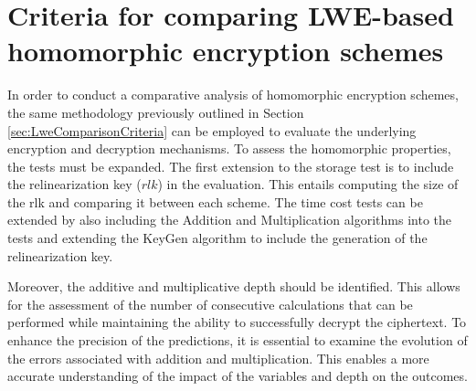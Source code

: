 \section{Criteria for comparing LWE-based homomorphic encryption schemes}

In order to conduct a comparative analysis of homomorphic encryption schemes, the same methodology previously outlined in Section \ref{sec:LweComparisonCriteria} can be employed to evaluate the underlying encryption and decryption mechanisms. To assess the homomorphic properties, the tests must be expanded. The first extension to the storage test is to include the relinearization key ($rlk$) in the evaluation. This entails computing the size of the rlk and comparing it between each scheme. The time cost tests can be extended by also including the Addition and Multiplication algorithms into the tests and extending the KeyGen algorithm to include the generation of the relinearization key.

Moreover, the additive and multiplicative depth should be identified. This allows for the assessment of the number of consecutive calculations that can be performed while maintaining the ability to successfully decrypt the ciphertext. To enhance the precision of the predictions, it is essential to examine the evolution of the errors associated with addition and multiplication. This enables a more accurate understanding of the impact of the variables and depth on the outcomes.






